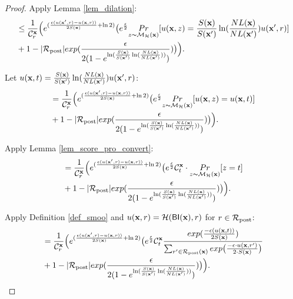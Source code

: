 \documentclass{article}
\begin{document}
\begin{proof}
      Apply Lemma \ref{lem_dilation}:
      \begin{equation*}
      \begin{split}
      & \leq \frac{1}{\mathcal{C}^{\textbf{x}}_{r}} \Big( e^{(\frac{\epsilon (u(\textbf{x}', {r}) - u(\textbf{x}, {r}))}{2 S(\textbf{x})} + \ln 2)} 
      \big( e^{\frac{\epsilon}{2}}
      \underset{z \thicksim \mathcal{M}_{\mathcal{H}}(\textbf{x})}{Pr}[u(\textbf{x}, {z}) = \frac{S(\textbf{x})}{S(\textbf{x}')} \ln(\frac{NL(\textbf{x})}{NL(\textbf{x}')}) u(\textbf{x}', {r}) ] \\
      & + 1 - |\mathcal{R}_{\textup{post}}|exp(\frac{\epsilon}{2 (1 - e ^ {\ln(\frac{S(\textbf{x})}{S(\textbf{x}')} \ln(\frac{NL(\textbf{x})}{NL(\textbf{x}')}))})}) 
      \big ) \Big).
      \end{split}
      \end{equation*}

      Let $u(\textbf{x}, {t}) = \frac{S(\textbf{x})}{S(\textbf{x}')} \ln(\frac{NL(\textbf{x})}{NL(\textbf{x}')}) u(\textbf{x}', {r})$:      
      \begin{equation*}
      \begin{split}
      & = \frac{1}{\mathcal{C}^{\textbf{x}}_{r}} \Big( e^{(\frac{\epsilon (u(\textbf{x}', {r}) - u(\textbf{x}, {r}))}{2 S(\textbf{x})} + \ln 2)} 
      \big( e^{\frac{\epsilon}{2}}
      \underset{z \thicksim \mathcal{M}_{\mathcal{H}}(\textbf{x})}{Pr}[u(\textbf{x}, {z}) = u(\textbf{x}, {t}) ] \\
      & + 1 - |\mathcal{R}_{\textup{post}}|exp(\frac{\epsilon}{2 (1 - e ^ {\ln(\frac{S(\textbf{x})}{S(\textbf{x}')} \ln(\frac{NL(\textbf{x})}{NL(\textbf{x}')}))})}) 
      \big ) \Big).
      \end{split}
      \end{equation*}

      Apply Lemma \ref{lem_score_pro_convert}:
      \begin{equation*}
      \begin{split}
      & = \frac{1}{\mathcal{C}^{\textbf{x}}_{r}} \Big( e^{(\frac{\epsilon (u(\textbf{x}', {r}) - u(\textbf{x}, {r}))}{2 S(\textbf{x})} + \ln 2)} 
      \big( e^{\frac{\epsilon}{2}}
      \mathcal{C}^{\textbf{x}}_{t} \cdot \underset{z \thicksim \mathcal{M}_{\mathcal{H}}(\textbf{x})}{Pr}[z = t ] \\
      & + 1 - |\mathcal{R}_{\textup{post}}|exp(\frac{\epsilon}{2 (1 - e ^ {\ln(\frac{S(\textbf{x})}{S(\textbf{x}')} \ln(\frac{NL(\textbf{x})}{NL(\textbf{x}')}))})}) 
      \big ) \Big).
      \end{split}
      \end{equation*}

      Apply Definition \ref{def_smoo} and $u(\textbf{x}, {r}) = \mathcal{H}(\mathsf{BI}(\textbf{x}),r)$ for $r \in \mathcal{R}_{\textup{post}}$:
      \begin{equation*}
      \begin{split}          
      & = \frac{1}{\mathcal{C}^{\textbf{x}}_{r}} \Big( e^{(\frac{\epsilon (u(\textbf{x}', {r}) - u(\textbf{x}, {r}))}{2 S(\textbf{x})} + \ln 2)} 
      \big( e^{\frac{\epsilon}{2}}
      \mathcal{C}^{\textbf{x}}_{t}  \frac{exp(\frac{-\epsilon (u(\textbf{x}, {t}))}{2 S(\textbf{x})})}{\sum_{r'\in \mathcal{R}_{\textup{post}}(\textbf{x})} exp \big(\frac{-\epsilon\cdot u(\textbf{\textbf{x}}, r')}{2 \cdot S(\textbf{x})}\big)}\\
      & + 1 - |\mathcal{R}_{\textup{post}}|exp(\frac{\epsilon}{2 (1 - e ^ {\ln(\frac{S(\textbf{x})}{S(\textbf{x}')} \ln(\frac{NL(\textbf{x})}{NL(\textbf{x}')}))})}) 
      \big ) \Big).
      \end{split}
      \end{equation*}


\end{proof}
\end{document}
